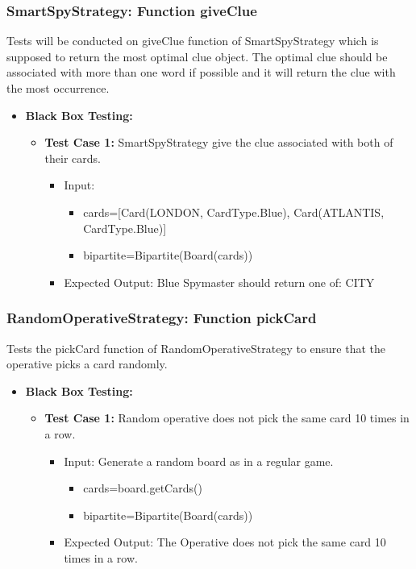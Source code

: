 \documentclass[12pt]{article}
\begin{document}

\subsubsection{SmartSpyStrategy: Function giveClue}
Tests will be conducted on giveClue function of SmartSpyStrategy which is supposed to return the most optimal clue object. The optimal clue should be associated with more than one word if possible and it will return the clue with the most occurrence.

\begin{itemize}
    \item \textbf{Black Box Testing:}
    \begin{itemize}
                \item \textbf{Test Case 1:} SmartSpyStrategy give the clue associated with both of their cards.
            \begin{itemize}
            \item Input: 
                \begin{itemize}
                    \item cards=[Card(LONDON, CardType.Blue), Card(ATLANTIS, CardType.Blue)]
                    \item bipartite=Bipartite(Board(cards))
                \end{itemize}
            \item Expected Output: Blue Spymaster should return one of: CITY
        \end{itemize}
    \end{itemize}
\end{itemize}


\subsubsection{RandomOperativeStrategy: Function pickCard}
Tests the pickCard function of RandomOperativeStrategy to ensure that the operative picks a card randomly.

\begin{itemize}
    \item \textbf{Black Box Testing:}
    \begin{itemize}
        \item \textbf{Test Case 1:} Random operative does not pick the same card 10 times in a row.
            \begin{itemize}
            \item Input: Generate a random board as in a regular game.
                \begin{itemize}
                    \item cards=board.getCards()
                    \item bipartite=Bipartite(Board(cards))
                \end{itemize}
            \item Expected Output: The Operative does not pick the same card 10 times in a row.
        \end{itemize}
    \end{itemize}
\end{itemize}
\end{document}
